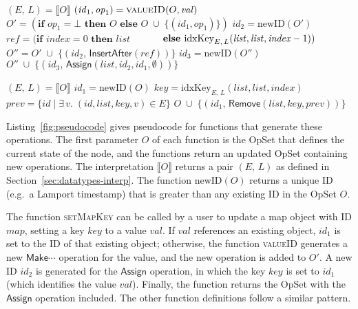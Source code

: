 \begin{algorithm}[t]
\begin{minipage}[t]{0.5\textwidth}
\begin{algorithmic}
    \State $(E,\, L) = \llbracket O \rrbracket$
    \State $(\mathit{id}_1, \mathit{op}_1) = \Call{valueID}{O, \mathit{val}}$
    \State $O' = (\textbf{if } \mathit{op}_1 = \bot \textbf{ then } O \textbf{ else } 
        O \;\cup\; \big\{ (\mathit{id}_1, \mathit{op}_1) \big\})$
    \State $\mathit{id}_2 = \mathrm{newID}(O')$
    \State $\mathit{ref} = (\textbf{if } \mathit{index}=0 \textbf{ then } \mathit{list}$
    \State $\hphantom{\mathit{ref} = (}\textbf{else } \mathrm{idxKey}_{E,\, L}(\mathit{list}, \mathit{list}, \mathit{index} - 1))$
    \State $O'' = O' \;\cup\; \big\{ (\mathit{id}_2,\, \mathsf{InsertAfter}(\mathit{ref})) \big\}$
    \State $\mathit{id}_3 = \mathrm{newID}(O'')$
    \State \Return $O'' \;\cup\; \big\{ (\mathit{id}_3,\, \mathsf{Assign}(\mathit{list}, \mathit{id}_2, \mathit{id}_1, \emptyset)) \big\}$
    \EndFunction\Statex

    \State $(E,\, L) = \llbracket O \rrbracket$
    \State $\mathit{id}_1 = \mathrm{newID}(O)$
    \State $\mathit{key} = \mathrm{idxKey}_{E,\, L}(\mathit{list}, \mathit{list}, \mathit{index})$
    \State $\mathit{prev} = \{ \mathit{id} \mid \exists\,v.\; (\mathit{id}, \mathit{list}, \mathit{key}, v) \in E \}$
    \State \Return $O \;\cup\; \big\{ (\mathit{id}_1,\, \mathsf{Remove}(\mathit{list}, \mathit{key}, \mathit{prev})) \big\}$
    \EndFunction
\end{algorithmic}
\end{minipage}
\end{algorithm}

\noindent
Listing~\ref{fig:pseudocode} gives pseudocode for functions that generate these operations.
The first parameter $O$ of each function is the OpSet that defines the current state of the node, and the functions return an updated OpSet containing new operations.
The interpretation $\llbracket O \rrbracket$ returns a pair $(E,\, L)$ as defined in Section~\ref{sec:datatypes-interp}.
The function $\mathrm{newID}(O)$ returns a unique ID (e.g.\ a Lamport timestamp) that is greater than any existing ID in the OpSet $O$.

The function \textsc{setMapKey} can be called by a user to update a map object with ID $\mathit{map}$, setting a key $\mathit{key}$ to a value $\mathit{val}$.
If $\mathit{val}$ references an existing object, $\mathit{id}_1$ is set to the ID of that existing object; otherwise, the function \textsc{valueID} generates a new $\mathsf{Make}\cdots$ operation for the value, and the new operation is added to $O'$.
A new ID $\mathit{id}_2$ is generated for the $\mathsf{Assign}$ operation, in which the key $\mathit{key}$ is set to $\mathit{id}_1$ (which identifies the value $\mathit{val}$).
Finally, the function returns the OpSet with the $\mathsf{Assign}$ operation included.
The other function definitions follow a similar pattern.

